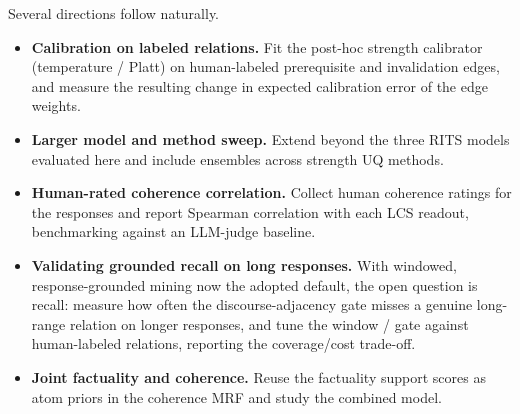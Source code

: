\documentclass[11pt]{article}
\begin{document}
Several directions follow naturally.
\begin{itemize}
  \item \textbf{Calibration on labeled relations.} Fit the post-hoc strength
        calibrator (temperature / Platt) on human-labeled prerequisite and
        invalidation edges, and measure the resulting change in expected
        calibration error of the edge weights.
  \item \textbf{Larger model and method sweep.} Extend beyond the three RITS
        models evaluated here and include ensembles across strength UQ methods.
  \item \textbf{Human-rated coherence correlation.} Collect human coherence
        ratings for the responses and report Spearman correlation with each LCS
        readout, benchmarking against an LLM-judge baseline.
  \item \textbf{Validating grounded recall on long responses.} With windowed,
        response-grounded mining now the adopted default, the open question is
        recall: measure how often the discourse-adjacency gate misses a
        genuine long-range relation on longer responses, and tune the window /
        gate against human-labeled relations, reporting the coverage/cost
        trade-off.
  \item \textbf{Joint factuality and coherence.} Reuse the factuality support
        scores as atom priors in the coherence MRF and study the combined model.
\end{itemize}
\end{document}
